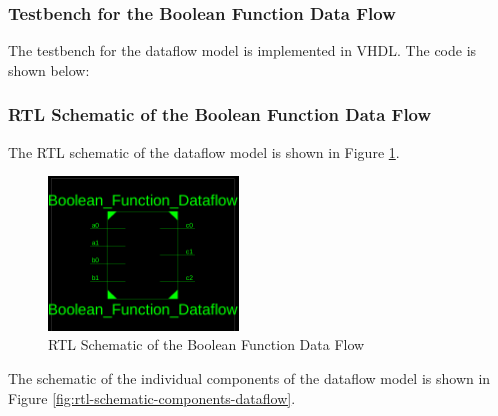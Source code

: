 \documentclass[table]{article}
\begin{document}
\subsubsection*{Testbench for the Boolean Function Data Flow}

The testbench for the dataflow model is implemented in VHDL. The code is shown below:

\begin{center} %
    \lstset{
  caption= Boolean\_Function\_Data\_Flow\_tb.vhd, 
  basicstyle=\footnotesize, frame=tb,
  xleftmargin=.2\textwidth, xrightmargin=.2\textwidth
}
    


\end{center}

\subsubsection{RTL Schematic of the Boolean Function Data Flow}

The RTL schematic of the dataflow model is shown in Figure \ref{fig:rtl-schematic-dataflow}.

\begin{figure}[H]
    \centering
    \includegraphics[width=0.45\textwidth]{img/rtl_df_1.png}
    \caption{RTL Schematic of the Boolean Function Data Flow}
    \label{fig:rtl-schematic-dataflow}
\end{figure}

The schematic of the individual components of the dataflow model is shown in Figure \ref{fig:rtl-schematic-components-dataflow}.
\end{document}
